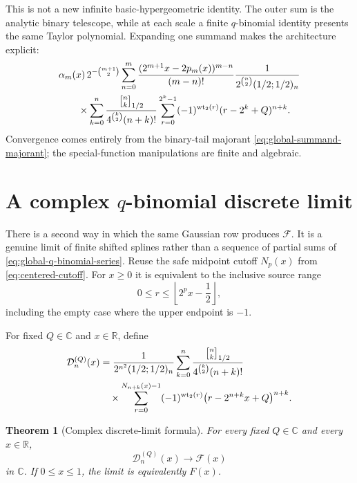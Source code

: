 \documentclass[11pt,oneside]{article}
\newtheorem{theorem}{Theorem}[section]
\theoremstyle{definition}
\theoremstyle{remark}
\newcommand{\R}{\mathbb R}
\newcommand{\C}{\mathbb C}
\newcommand{\wt}{\operatorname{wt}_2}
\newcommand{\qbinom}[3]{\genfrac{[}{]}{0pt}{}{#1}{#2}_{#3}}
\begin{document}
This is not a new infinite basic-hypergeometric identity.  The outer sum is the analytic
binary telescope, while at each scale a finite $q$-binomial identity presents the same
Taylor polynomial.  Expanding one summand makes the architecture explicit:
\begin{align}
 &\alpha_m(x)\,2^{-\binom{m+1}{2}}
 \sum_{n=0}^{m}
 \frac{(2^{m+1}x-2p_m(x))^{m-n}}{(m-n)!}
 \frac1{2^{\binom n2}(1/2;1/2)_n}                       \notag\\
 &\qquad\times
 \sum_{k=0}^{n}
 \frac{\qbinom nk{1/2}}{4^{\binom k2}(n+k)!}
 \sum_{r=0}^{2^k-1}(-1)^{\wt(r)}
 (r-2^k+Q)^{n+k}.                                       \label{eq:global-q-literal-summand}
\end{align}
Convergence comes entirely from the binary-tail majorant
\eqref{eq:global-summand-majorant}; the special-function manipulations are finite and
algebraic.

\section{A complex $q$-binomial discrete limit}
\label{sec:q-discrete-limit}

There is a second way in which the same Gaussian row produces $\mathcal F$.  It is a genuine
limit of finite shifted splines rather than a sequence of partial sums of
\eqref{eq:global-q-binomial-series}.  Reuse the safe midpoint cutoff $N_p(x)$ from
\eqref{eq:centered-cutoff}.  For $x\ge0$ it is equivalent to the inclusive source range
\begin{equation}
 0\le r\le\left\lfloor2^px-\frac12\right\rfloor,          \label{eq:discrete-cutoff-inclusive}
\end{equation}
including the empty case where the upper endpoint is $-1$.

For fixed $Q\in\C$ and $x\in\R$, define
\begin{align}
 \mathcal D_n^{(Q)}(x)
 &=
 \frac1{2^{n^2}(1/2;1/2)_n}
 \sum_{k=0}^{n}
 \frac{\qbinom nk{1/2}}{4^{\binom k2}(n+k)!}             \notag\\
 &\quad\times
 \sum_{r=0}^{N_{n+k}(x)-1}(-1)^{\wt(r)}
 \bigl(r-2^{n+k}x+Q\bigr)^{n+k}.                         \label{eq:discrete-q-approximant}
\end{align}

\begin{theorem}[Complex discrete-limit formula]
For every fixed $Q\in\C$ and every $x\in\R$,
\begin{equation}
 \boxed{\mathcal D_n^{(Q)}(x)\longrightarrow\mathcal F(x)}
                                                               \label{eq:discrete-q-limit}
\end{equation}
in $\C$.  If $0\le x\le1$, the limit is equivalently $F(x)$.
\end{theorem}
\end{document}
